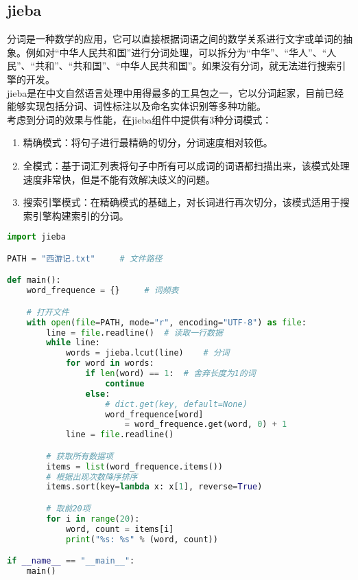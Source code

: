 \subsection{jieba}

分词是一种数学的应用，它可以直接根据词语之间的数学关系进行文字或单词的抽象。例如对“中华人民共和国”进行分词处理，可以拆分为“中华”、“华人”、“人民”、“共和”、“共和国”、“中华人民共和国”。如果没有分词，就无法进行搜索引擎的开发。\\

jieba是在中文自然语言处理中用得最多的工具包之一，它以分词起家，目前已经能够实现包括分词、词性标注以及命名实体识别等多种功能。\\

考虑到分词的效果与性能，在jieba组件中提供有3种分词模式：

\begin{enumerate}
    \item 精确模式：将句子进行最精确的切分，分词速度相对较低。

    \item 全模式：基于词汇列表将句子中所有可以成词的词语都扫描出来，该模式处理速度非常快，但是不能有效解决歧义的问题。

    \item 搜索引擎模式：在精确模式的基础上，对长词进行再次切分，该模式适用于搜索引擎构建索引的分词。
\end{enumerate}

\vspace{0.5cm}


\begin{lstlisting}[language=Python]
import jieba

PATH = "西游记.txt"     # 文件路径

def main():
    word_frequence = {}     # 词频表

    # 打开文件
    with open(file=PATH, mode="r", encoding="UTF-8") as file:
        line = file.readline()  # 读取一行数据
        while line:
            words = jieba.lcut(line)    # 分词
            for word in words:
                if len(word) == 1:  # 舍弃长度为1的词
                    continue
                else:
                    # dict.get(key, default=None)
                    word_frequence[word] 
                        = word_frequence.get(word, 0) + 1
            line = file.readline()

        # 获取所有数据项
        items = list(word_frequence.items())
        # 根据出现次数降序排序
        items.sort(key=lambda x: x[1], reverse=True)

        # 取前20项
        for i in range(20):
            word, count = items[i]
            print("%s: %s" % (word, count))

if __name__ == "__main__":
    main()
\end{lstlisting}

\newpage